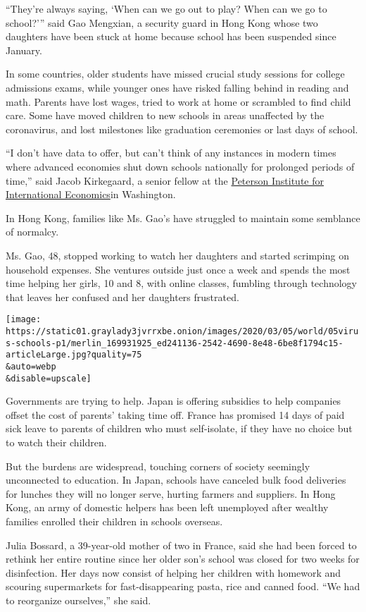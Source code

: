 ``They're always saying, `When can we go out to play? When can we go to
school?''' said Gao Mengxian, a security guard in Hong Kong whose two
daughters have been stuck at home because school has been suspended
since January.

In some countries, older students have missed crucial study sessions for
college admissions exams, while younger ones have risked falling behind
in reading and math. Parents have lost wages, tried to work at home or
scrambled to find child care. Some have moved children to new schools in
areas unaffected by the coronavirus, and lost milestones like graduation
ceremonies or last days of school.

``I don't have data to offer, but can't think of any instances in modern
times where advanced economies shut down schools nationally for
prolonged periods of time,'' said Jacob Kirkegaard, a senior fellow at
the \href{https://www.piie.com/}{Peterson Institute for International
Economics}in Washington.

In Hong Kong, families like Ms. Gao's have struggled to maintain some
semblance of normalcy.

Ms. Gao, 48, stopped working to watch her daughters and started
scrimping on household expenses. She ventures outside just once a week
and spends the most time helping her girls, 10 and 8, with online
classes, fumbling through technology that leaves her confused and her
daughters frustrated.

\texttt{[image: https://static01.graylady3jvrrxbe.onion/images/2020/03/05/world/05virus-schools-p1/merlin\_169931925\_ed241136-2542-4690-8e48-6be8f1794c15-articleLarge.jpg?quality=75\\\&auto=webp\\\&disable=upscale]}

Governments are trying to help. Japan is offering subsidies to help
companies offset the cost of parents' taking time off. France has
promised 14 days of paid sick leave to parents of children who must
self-isolate, if they have no choice but to watch their children.

But the burdens are widespread, touching corners of society seemingly
unconnected to education. In Japan, schools have canceled bulk food
deliveries for lunches they will no longer serve, hurting farmers and
suppliers. In Hong Kong, an army of domestic helpers has been left
unemployed after wealthy families enrolled their children in schools
overseas.

Julia Bossard, a 39-year-old mother of two in France, said she had been
forced to rethink her entire routine since her older son's school was
closed for two weeks for disinfection. Her days now consist of helping
her children with homework and scouring supermarkets for
fast-disappearing pasta, rice and canned food. ``We had to reorganize
ourselves,'' she said.

